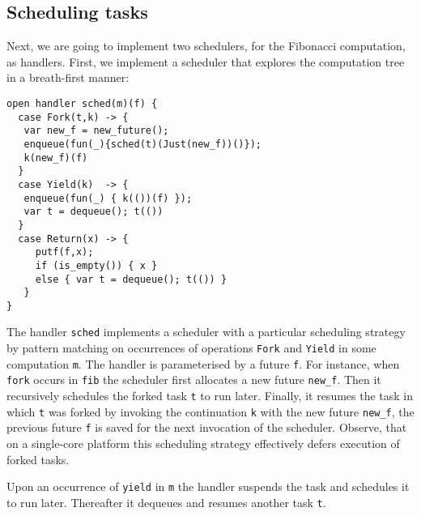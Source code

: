 \documentclass[preprint,10pt,numbers]{sigplanconf}
\begin{document}
\subsection{Scheduling tasks}\label{sec:sched}
Next, we are going to implement two schedulers, for the Fibonacci computation, as handlers.
First, we implement a scheduler that explores the computation tree in a breath-first manner:
\begin{lstlisting}[style={links},caption={}]
open handler sched(m)(f) {
  case Fork(t,k) -> {
   var new_f = new_future();
   enqueue(fun(_){sched(t)(Just(new_f))()});
   k(new_f)(f)
  }
  case Yield(k)  -> { 
   enqueue(fun(_) { k(())(f) }); 
   var t = dequeue(); t(()) 
  }
  case Return(x) -> {
     putf(f,x);
     if (is_empty()) { x }
     else { var t = dequeue(); t(()) }
   } 
}
\end{lstlisting}
The handler \texttt{sched} implements a scheduler with a particular scheduling strategy by pattern matching on occurrences of operations \texttt{Fork} and \texttt{Yield} in some computation \texttt{m}. The handler is parameterised by a future \texttt{f}. For instance, when \texttt{fork} occurs in \texttt{fib} the scheduler first allocates a new future \texttt{new\_f}. Then it recursively schedules the forked task \texttt{t} to run later. Finally, it resumes the task in which \texttt{t} was forked by invoking the continuation \texttt{k} with the new future \texttt{new\_f}, the previous future \texttt{f} is saved for the next invocation of the scheduler. Observe, that on a single-core platform this scheduling strategy effectively defers execution of forked tasks.

Upon an occurrence of \texttt{yield} in \texttt{m} the handler suspends the task and schedules it to run later. Thereafter it dequeues and resumes another task \texttt{t}.
\end{document}
